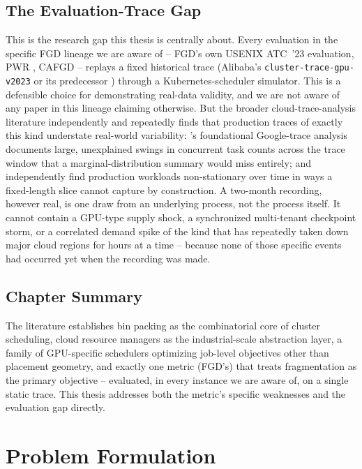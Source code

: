 \documentclass[12pt]{report}
\begin{document}
\section{The Evaluation-Trace Gap}
\label{sec:th-eval-gap}
This is the research gap this thesis is centrally about. Every
evaluation in the specific FGD lineage we are aware of -- FGD's own
USENIX ATC~'23 evaluation, PWR \citep{pwr2024}, CAFGD \citep{cafgd2025}
-- replays a fixed historical trace (Alibaba's
\texttt{cluster-trace-gpu-v2023} \citep{alibabatrace2023} or its
predecessor \citep{alibabatrace2020}) through a Kubernetes-scheduler
simulator. This is a defensible choice for demonstrating real-data
validity, and we are not aware of any paper in this lineage claiming
otherwise. But the broader cloud-trace-analysis literature independently
and repeatedly finds that production traces of exactly this kind
understate real-world variability: \citet{reiss2012}'s foundational
Google-trace analysis documents large, unexplained swings in concurrent
task counts across the trace window that a marginal-distribution
summary would miss entirely; \citet{cortez2017} and \citet{shahrad2020}
independently find production workloads non-stationary over time in ways
a fixed-length slice cannot capture by construction. A two-month
recording, however real, is one draw from an underlying process, not the
process itself. It cannot contain a GPU-type supply shock, a synchronized
multi-tenant checkpoint storm, or a correlated demand spike of the kind
that has repeatedly taken down major cloud regions for hours at a time
\citep{awsoutage2025,outagestats2025} -- because none of those specific
events had occurred yet when the recording was made.

\section{Chapter Summary}
The literature establishes bin packing as the combinatorial core of
cluster scheduling, cloud resource managers as the industrial-scale
abstraction layer, a family of GPU-specific schedulers optimizing
job-level objectives other than placement geometry, and exactly one
metric (FGD's) that treats fragmentation as the primary objective --
evaluated, in every instance we are aware of, on a single static trace.
This thesis addresses both the metric's specific weaknesses and the
evaluation gap directly.

\chapter{Problem Formulation}
\label{ch:problem}
\end{document}
